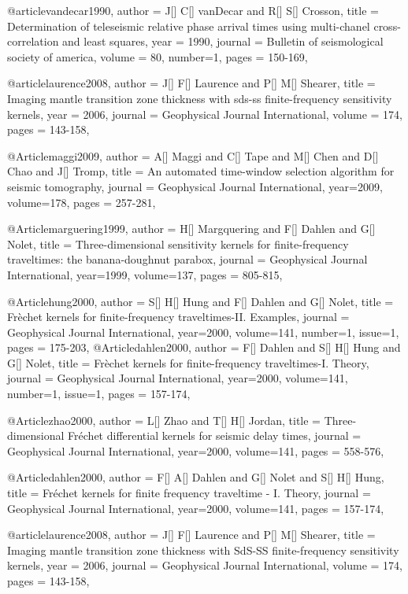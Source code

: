 @article{vandecar1990,
author = {J[] C[] vanDecar and R[] S[] Crosson},
title = {Determination of teleseismic relative phase arrival times using multi-chanel cross-correlation and least squares},
year = {1990},
journal = {Bulletin of seismological society of america},
volume = {80},
number=1,
pages = {150-169},
}

@article{laurence2008,
author = {J[] F[] Laurence and P[] M[] Shearer},
title = {Imaging mantle transition zone thickness with sds-ss finite-frequency sensitivity kernels},
year = {2006},
journal = {Geophysical Journal International},
volume = {174},
pages = {143-158},
}



@Article{maggi2009,
  author =	 {A[] Maggi and C[] Tape and M[] Chen and D[] Chao and J[] Tromp},
  title =	 {An automated time-window selection algorithm for seismic tomography},
  journal =	 {Geophysical Journal International},
  year=2009,
  volume=178,
  pages =	 {257-281},
}

@Article{marguering1999,
  author =	 {H[] Margquering and F[] Dahlen and G[] Nolet},
  title =	 {Three-dimensional sensitivity kernels for finite-frequency traveltimes: the banana-doughnut parabox},
  journal =	 {Geophysical Journal International},
  year=1999,
  volume=137,
  pages =	 {805-815},
}

@Article{hung2000,
  author =	 {S[] H[] Hung and F[] Dahlen and G[] Nolet},
  title =	 {Fr\`{e}chet kernels for finite-frequency traveltimes-II. Examples},
  journal =	 {Geophysical Journal International},
  year=2000,
  volume=141,
  number=1,
  issue=1,
  pages =	 {175-203},
}
@Article{dahlen2000,
  author =	 { F[] Dahlen and S[] H[] Hung and G[] Nolet},
  title =	 {Fr\`{e}chet kernels for finite-frequency traveltimes-I. Theory},
  journal =	 {Geophysical Journal International},
  year=2000,
  volume=141,
  number=1,
  issue=1,
  pages =	 {157-174},
}

@Article{zhao2000,
  author =	 {L[] Zhao and T[] H[] Jordan},
  title =	 {Three-dimensional Fr\'{e}chet differential kernels for seismic delay times},
  journal =	 {Geophysical Journal International},
  year=2000,
  volume=141,
  pages =	 {558-576},
}

@Article{dahlen2000,
  author =	 {F[] A[] Dahlen and G[] Nolet and S[] H[] Hung},
  title =	 {Fr\'{e}chet kernels for finite frequency traveltime - {I}. Theory},
  journal =	 {Geophysical Journal International},
  year=2000,
  volume=141,
  pages =	 {157-174},
}

@article{laurence2008,
author = {J[] F[] Laurence and P[] M[] Shearer},
title = {Imaging mantle transition zone thickness with {S}d{S-SS} finite-frequency sensitivity kernels},
year = {2006},
journal = {Geophysical Journal International},
volume = {174},
pages = {143-158},
}

